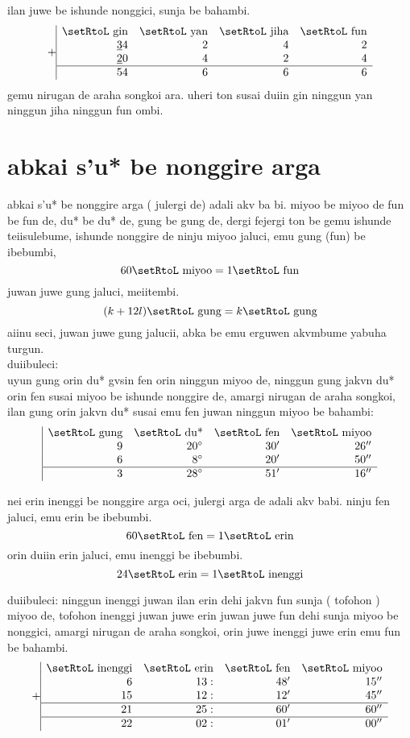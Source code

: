 \documentclass{report}
\begin{document}
ilan juwe be ishunde nonggici, sunja be bahambi.
\[
    +\begin{array}{|rrrr}
        \text{\setRtoL gin} & \text{\setRtoL yan} & \text{\setRtoL jiha} & \text{\setRtoL fun}\\
        \underline{3}{4} & {2} & 4 & {2}\\
        \underline{2}{0} & {4} & 2 & {4}\\\hline
        54 & 6 & 6 & 6
    \end{array}
\]
gemu nirugan de araha songkoi ara. uheri ton susai duiin gin ninggun yan ninggun jiha ninggun fun ombi.\\

\section{abkai s'u* be nonggire arga}
abkai s'u* be nonggire arga ( julergi de) adali akv ba bi. miyoo be miyoo de fun be fun de, du* be du* de, gung be gung de, dergi fejergi ton be gemu ishunde teiisulebume, ishunde nonggire de ninju miyoo jaluci, emu gung (fun) be ibebumbi,
\[
    60 \text{\setRtoL miyoo} = 1 \text{\setRtoL fun}
\]
juwan juwe gung jaluci, meiitembi.
\[
    (k + 12l) \text{\setRtoL gung} = k \text{\setRtoL gung}
\]
aiinu seci, juwan juwe gung jalucii, abka be emu erguwen akvmbume yabuha turgun.\\

duiibuleci:\\
uyun gung orin du* gvsin fen orin ninggun miyoo de, ninggun gung jakvn du*  orin fen susai miyoo be ishunde nonggire de, amargi nirugan de araha songkoi, ilan gung orin jakvn du* susai emu fen juwan ninggun miyoo be bahambi:
\[
    \begin{array}{|rrrr}
        \text{\setRtoL gung} & \text{\setRtoL du*} & \text{\setRtoL fen} & \text{\setRtoL miyoo}\\
        9 & 20^\circ & 30' & 26''\\
        6 & 8^\circ & 20' & 50''\\\hline
        3 & 28^\circ & 51' & 16''
    \end{array}
\]

nei erin inenggi be nonggire arga oci, julergi arga de adali akv babi. ninju fen jaluci, emu erin be ibebumbi.
\[
    60 \text{\setRtoL fen} = 1 \text{\setRtoL erin}
\]
orin duiin erin jaluci, emu inenggi be ibebumbi.
\[
    24 \text{\setRtoL erin} = 1 \text{\setRtoL inenggi}
\]

duiibuleci:
ninggun inenggi juwan ilan erin dehi jakvn fun sunja ( tofohon ) miyoo de, tofohon inenggi juwan juwe erin juwan juwe fun dehi sunja miyoo be nonggici, amargi nirugan de araha songkoi, orin juwe inenggi juwe erin emu fun be bahambi.
\[
    +\begin{array}{|rrrr}
        \text{\setRtoL inenggi} & \text{\setRtoL erin} & \text{\setRtoL fen} & \text{\setRtoL miyoo}\\
        6 & 13: & 48' & 15''\\
        15 & 12: & 12' & 45''\\\hline
        21 & 25: & 60' & 60''\\\hline
        22 & 02: & 01' & 00''
    \end{array}
\]
\end{document}
